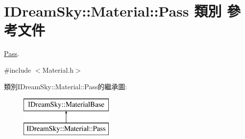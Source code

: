 \hypertarget{class_i_dream_sky_1_1_material_1_1_pass}{}\section{I\+Dream\+Sky\+:\+:Material\+:\+:Pass 類別 參考文件}
\label{class_i_dream_sky_1_1_material_1_1_pass}


\hyperlink{class_i_dream_sky_1_1_material_1_1_pass}{Pass}.  




{\ttfamily \#include $<$Material.\+h$>$}

類別\+I\+Dream\+Sky\+:\+:Material\+:\+:Pass的繼承圖\+:\begin{figure}[H]
\begin{center}
\leavevmode
\includegraphics[height=2.000000cm]{class_i_dream_sky_1_1_material_1_1_pass}
\end{center}
\end{figure}
